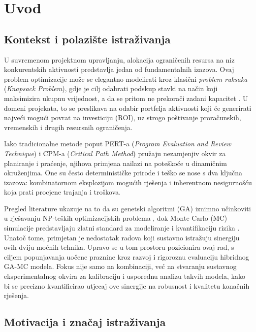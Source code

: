\section{Uvod}
\label{chap:uvod}

\subsection{Kontekst i polazište istraživanja}

U suvremenom projektnom upravljanju, alokacija ograničenih resursa na niz konkurentskih aktivnosti predstavlja jedan od fundamentalnih izazova. Ovaj problem optimizacije može se elegantno modelirati kroz klasični \textit{problem ruksaka} (\textit{Knapsack Problem}), gdje je cilj odabrati podskup stavki na način koji maksimizira ukupnu vrijednost, a da se pritom ne prekorači zadani kapacitet \cite{Kellerer2004}. U domeni projekata, to se preslikava na odabir portfelja aktivnosti koji će generirati najveći mogući povrat na investiciju (ROI), uz strogo poštivanje proračunskih, vremenskih i drugih resursnih ograničenja.

Iako tradicionalne metode poput PERT-a (\textit{Program Evaluation and Review Technique}) i CPM-a (\textit{Critical Path Method}) \cite{Malcolm1959,Kerzner2017} pružaju nezamjenjiv okvir za planiranje i praćenje, njihova primjena nailazi na poteškoće u dinamičnim okruženjima. One su često determinističke prirode i teško se nose s dva ključna izazova: kombinatornom eksplozijom mogućih rješenja i inherentnom nesigurnošću koja prati procjene trajanja i troškova.

Pregled literature ukazuje na to da su genetski algoritmi (GA) iznimno učinkoviti u rješavanju NP-teških optimizacijskih problema \cite{Holland1975,Goldberg1989}, dok Monte Carlo (MC) simulacije predstavljaju zlatni standard za modeliranje i kvantifikaciju rizika \cite{Metropolis1949,Rubinstein2016}. Unatoč tome, primjetan je nedostatak radova koji sustavno istražuju sinergiju ovih dviju moćnih tehnika. Upravo se u tom prostoru pozicionira ovaj rad, s ciljem popunjavanja uočene praznine kroz razvoj i rigoroznu evaluaciju hibridnog GA-MC modela. Fokus nije samo na kombinaciji, već na stvaranju sustavnog eksperimentalnog okvira za kalibraciju i usporednu analizu takvih modela, kako bi se precizno kvantificirao utjecaj ove sinergije na robusnost i kvalitetu konačnih rješenja.

\subsection{Motivacija i značaj istraživanja}

